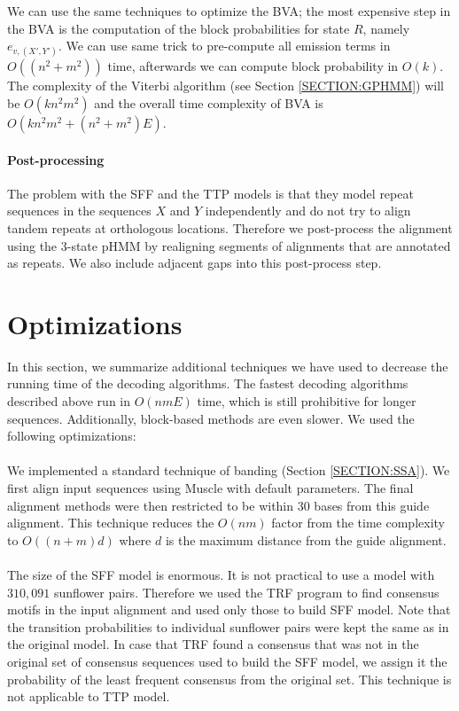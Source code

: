 We can use the same techniques to optimize the BVA; the most expensive step in
the BVA is the computation of the block probabilities for state $R$, namely
$e_{v,(X',Y')}$. We can use same trick to pre-compute all emission terms in
$O((n^2+m^2))$ time, afterwards we can compute block probability in $O(k)$.
The complexity of the Viterbi algorithm (see Section \ref{SECTION:GPHMM})
will be $O(kn^2m^2)$ and the overall time complexity of BVA is $O(kn^2m^2 +
(n^2+m^2)E)$. 

\paragraph{Post-processing}
The problem with the SFF and the TTP models is that they model repeat sequences
in the sequences $X$ and $Y$ independently and do not try to align tandem
repeats at orthologous locations.  Therefore we post-process the alignment using
the 3-state pHMM by realigning segments of alignments that are annotated as
repeats. We also include adjacent gaps into this post-process step.

\section{Optimizations}\label{SECTION:REPOPT}

In this section, we summarize additional techniques we have used to decrease the
running time of the decoding algorithms. The fastest decoding algorithms described
above run in $O(nmE)$ time, which is still prohibitive for longer sequences.
Additionally, block-based methods are even slower. We used the following
optimizations:

\paragraph{}
We implemented a standard technique of banding (Section \ref{SECTION:SSA}). We
first align input sequences using Muscle \cite{Edgar2004} with default
parameters.  The final alignment methods were then restricted to be within 30
bases from this guide alignment. This technique reduces the $O(nm)$ factor from
the time complexity to $O((n+m)d)$ where $d$ is the maximum distance from the
guide alignment.

\paragraph{}
The size of the SFF model is enormous. It is not practical to use a model with
$310,091$ sunflower pairs. Therefore we used the TRF program \cite{Benson1999}
to find consensus motifs in the input alignment and used only those to build
SFF model. Note that the transition probabilities to individual sunflower pairs
were kept the same as in the original model. In case that TRF found a consensus
that was not in the original set of consensus sequences used to build the SFF
model, we assign it the probability of the least frequent consensus from the
original set. This technique is not applicable to TTP model.

